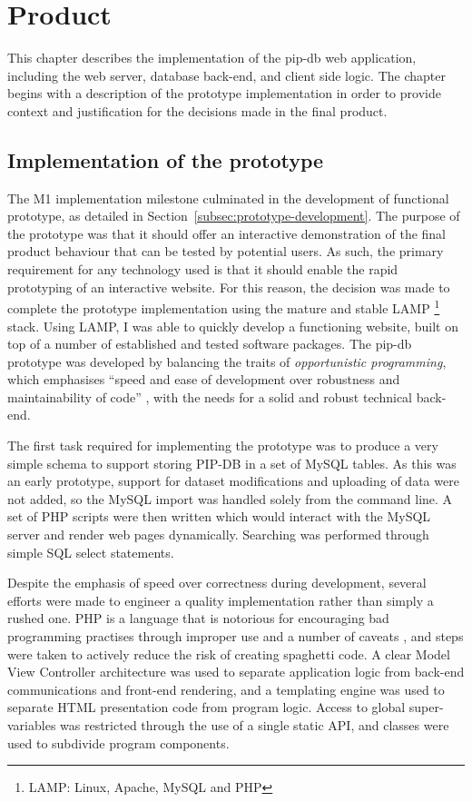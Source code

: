 \chapter{Product}\label{chap:product}

This chapter describes the implementation of the pip-db web
application, including the web server, database back-end, and client
side logic. The chapter begins with a description of the prototype
implementation in order to provide context and justification for the
decisions made in the final product.

\section{Implementation of the prototype}\label{sec:prototype-implementation}

The M1 implementation milestone culminated in the development of
functional prototype, as detailed in
Section~\ref{subsec:prototype-development}. The purpose of the
prototype was that it should offer an interactive demonstration of the
final product behaviour that can be tested by potential users. As
such, the primary requirement for any technology used is that it
should enable the rapid prototyping of an interactive website. For
this reason, the decision was made to complete the prototype
implementation using the mature and stable LAMP \footnote{LAMP: Linux,
  Apache, MySQL and PHP} stack. Using LAMP, I was able to quickly
develop a functioning website, built on top of a number of established
and tested software packages. The pip-db prototype was developed by
balancing the traits of \textit{opportunistic programming}, which
emphasises ``speed and ease of development over robustness and
maintainability of code'' \cite{brandt2008opportunistic}, with the
needs for a solid and robust technical back-end.

The first task required for implementing the prototype was to produce
a very simple schema to support storing PIP-DB in a set of MySQL
tables. As this was an early prototype, support for dataset
modifications and uploading of data were not added, so the MySQL
import was handled solely from the command line. A set of PHP scripts
were then written which would interact with the MySQL server and
render web pages dynamically. Searching was performed through simple
SQL select statements.

Despite the emphasis of speed over correctness during development,
several efforts were made to engineer a quality implementation rather
than simply a rushed one. PHP is a language that is notorious for
encouraging bad programming practises through improper use and a
number of caveats \cite{munroe2012php}, and steps were taken to
actively reduce the risk of creating spaghetti code. A clear Model
View Controller architecture was used to separate application logic
from back-end communications and front-end rendering, and a templating
engine was used to separate HTML presentation code from program
logic. Access to global super-variables was restricted through the use
of a single static API, and classes were used to subdivide program
components.

